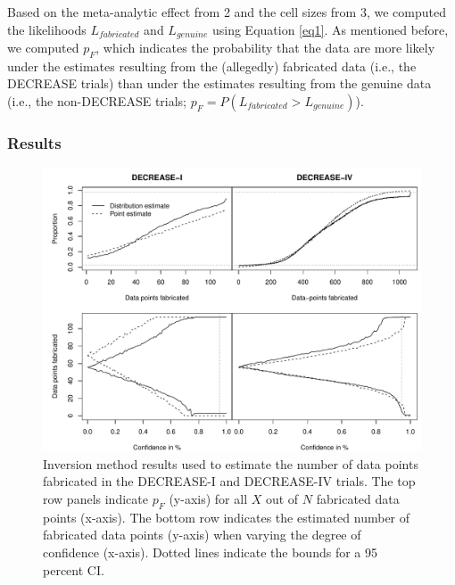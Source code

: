 \documentclass[]{article}
\begin{document}
Based on the meta-analytic effect from 2 and the cell sizes from 3, we
computed the likelihoods \(L_{fabricated}\) and \(L_{genuine}\) using
Equation \ref{eq1}. As mentioned before, we computed \(p_F\), which
indicates the probability that the data are more likely under the
estimates resulting from the (allegedly) fabricated data (i.e., the
DECREASE trials) than under the estimates resulting from the genuine
data (i.e., the non-DECREASE trials;
\(p_F=P(L_{fabricated}>L_{genuine})\)).

\subsubsection{Results}\label{results-2}

\begin{figure}

{\centering \includegraphics[width=0.8\linewidth]{../figures/fig3} 

}

\caption{Inversion method results used to estimate the number of data points fabricated in the DECREASE-I and DECREASE-IV trials. The top row panels indicate $p_F$ (y-axis) for all $X$ out of $N$ fabricated data points (x-axis). The bottom row indicates the estimated number of fabricated data points (y-axis) when varying the degree of confidence (x-axis). Dotted lines indicate the bounds for a 95 percent CI.}\label{fig:figure 3}
\end{figure}
\end{document}
